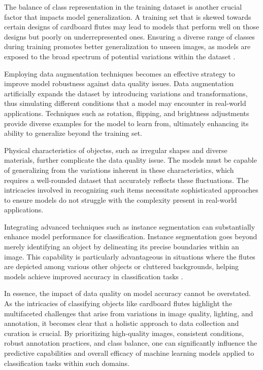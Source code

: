 The balance of class representation in the training dataset is another crucial factor that impacts model generalization. A training set that is skewed towards certain designs of cardboard flutes may lead to models that perform well on those designs but poorly on underrepresented ones. Ensuring a diverse range of classes during training promotes better generalization to unseen images, as models are exposed to the broad spectrum of potential variations within the dataset \cite{garcia2020bias}.


Employing data augmentation techniques becomes an effective strategy to improve model robustness against data quality issues. Data augmentation artificially expands the dataset by introducing variations and transformations, thus simulating different conditions that a model may encounter in real-world applications. Techniques such as rotation, flipping, and brightness adjustments provide diverse examples for the model to learn from, ultimately enhancing its ability to generalize beyond the training set.




Physical characteristics of objectss, such as irregular shapes and diverse materials, further complicate the data quality issue. The models must be capable of generalizing from the variations inherent in these characteristics, which requires a well-rounded dataset that accurately reflects these fluctuations. The intricacies involved in recognizing such items necessitate sophisticated approaches to ensure models do not struggle with the complexity present in real-world applications.



Integrating advanced techniques such as instance segmentation can substantially enhance model performance for classification. Instance segmentation goes beyond merely identifying an object by delineating its precise boundaries within an image. This capability is particularly advantageous in situations where the flutes are depicted among various other objects or cluttered backgrounds, helping models achieve improved accuracy in classification tasks \cite{xu2020instance}.



In essence, the impact of data quality on model accuracy cannot be overstated. As the intricacies of classifying objects like cardboard flutes highlight the multifaceted challenges that arise from variations in image quality, lighting, and annotation, it becomes clear that a holistic approach to data collection and curation is crucial. By prioritizing high-quality images, consistent conditions, robust annotation practices, and class balance, one can significantly influence the predictive capabilities and overall efficacy of machine learning models applied to classification tasks within such domains.

